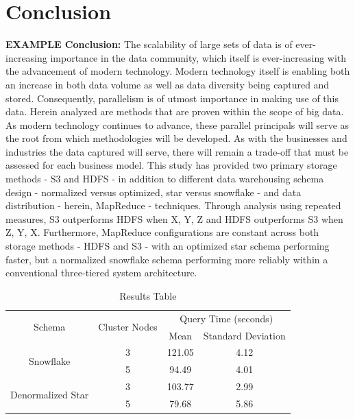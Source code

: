\documentclass[journal]{IEEEtran}
\begin{document}
\section{Conclusion}

\textbf{EXAMPLE Conclusion:}
The scalability of large sets of data is of ever-increasing importance in the data community, which itself is ever-increasing with the advancement of modern technology. Modern technology itself is enabling both an increase in both data volume as well as data diversity being captured and stored. Consequently, parallelism is of utmost importance in making use of this data. Herein analyzed are methods that are proven within the scope of big data. As modern technology continues to advance, these parallel principals will serve as the root from which methodologies will be developed. As with the businesses and industries the data captured will serve, there will remain a trade-off that must be assessed for each business model. This study has provided two primary storage methods - S3 and HDFS - in addition to different data warehousing schema design - normalized versus optimized, star versus snowflake - and data distribution - herein, MapReduce - techniques. Through analysis using repeated measures, S3 outperforms HDFS when X, Y, Z and HDFS outperforms S3 when Z, Y, X. Furthermore, MapReduce configurations are constant across both storage methods - HDFS and S3 - with an optimized star schema performing faster, but a normalized snowflake schema performing more reliably within a conventional three-tiered system architecture.

\ifCLASSOPTIONcaptionsoff
  \newpage
\fi

\begin{table}
    \renewcommand{\arraystretch}{1.3}
    \caption{Results Table}
    \label{ResultsTable}
    \centering
    \begin{tabular}{c c c c}
        \hline
        \hline
        \multirow{2}{*}{Schema} & \multirow{2}{*}{Cluster Nodes} &
        \multicolumn{2}{c}{Query Time (seconds)}   \\
        \cline{3-4}
                                           &     & Mean & Standard Deviation\\
        \hline
        \multirow{2}{*}{Snowflake}         & 3   & 121.05 & 4.12 \\
        
                                           & 5   & 94.49 & 4.01  \\

        \hline
        \multirow{2}{*}{Denormalized Star} & 3   & 103.77 & 2.99 \\
        
                                           & 5   & 79.68 & 5.86  \\

        \hline
        \hline
    \end{tabular}
\end{table}
\end{document}

